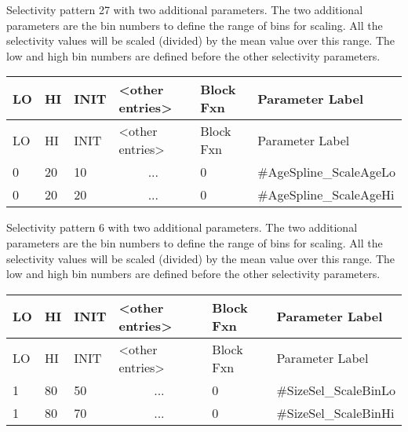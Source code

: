 Selectivity pattern 27 with two additional parameters. The two additional parameters are the bin numbers to define the range of bins for scaling. All the selectivity values will be scaled (divided) by the mean value over this range. The low and high bin numbers are defined before the other selectivity parameters.

	\begin{longtable}{p{1cm} p{1cm} p{1cm} p{2.9cm} p{1.9cm} p{4.2cm}}
		\hline
		LO \Tstrut & HI & INIT & <other entries> & Block Fxn & Parameter Label \Bstrut\\
		\hline
		\endfirsthead
	
		\hline
		LO \Tstrut & HI & INIT & <other entries> & Block Fxn & Parameter Label \Bstrut\\
		\hline
		\endhead

		0 & 20 & 10 & \multicolumn{1}{c}{...} & 0 & \#AgeSpline\_ScaleAgeLo \Tstrut\\
		0 & 20 & 20 & \multicolumn{1}{c}{...} & 0 & \#AgeSpline\_ScaleAgeHi \Bstrut\\
		\hline
	\end{longtable}

Selectivity pattern 6 with two additional parameters. The two additional parameters are the bin numbers to define the range of bins for scaling. All the selectivity values will be scaled (divided) by the mean value over this range. The low and high bin numbers are defined before the other selectivity parameters.
	
	\begin{longtable}{p{1cm} p{1cm} p{1cm} p{2.9cm} p{1.9cm} p{4.2cm}}
		\hline
		LO \Tstrut & HI & INIT & <other entries> & Block Fxn & Parameter Label \Bstrut\\
		\hline
		\endfirsthead
	
		\hline
		LO \Tstrut & HI & INIT & <other entries> & Block Fxn & Parameter Label \Bstrut\\
		\hline
		\endhead

		1 & 80 & 50 & \multicolumn{1}{c}{...} & 0 & \#SizeSel\_ScaleBinLo \Tstrut\\
		1 & 80 & 70 & \multicolumn{1}{c}{...} & 0 & \#SizeSel\_ScaleBinHi \Bstrut\\
		\hline
	\end{longtable}

